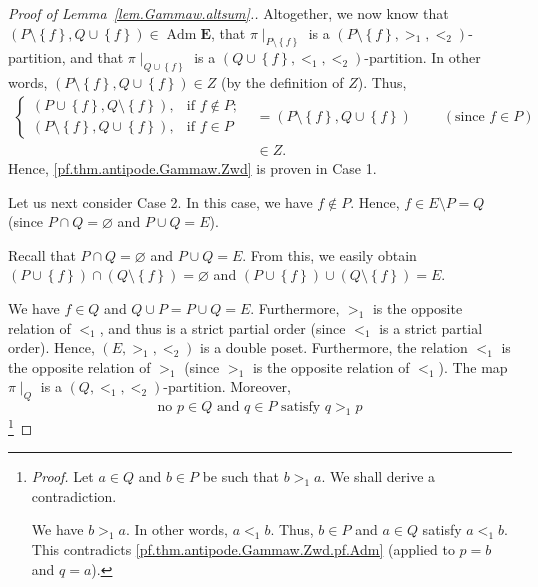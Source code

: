 \documentclass[12pt]{article}
\theoremstyle{plain}
\theoremstyle{definition}
\theoremstyle{remark}
\newcommand{\Adm}{\operatorname{Adm}}
\newcommand{\EE}{{\mathbf{E}}}
\begin{document}
\begin{proof}[Proof of Lemma~\ref{lem.Gammaw.altsum}.]
Altogether, we now know that $\left(  P\setminus\left\{  f\right\}
,Q\cup\left\{  f\right\}  \right)  \in \Adm \EE$, that
$\pi\mid_{P\setminus\left\{  f\right\}  }$ is a $\left(  P\setminus\left\{
f\right\}  ,>_{1},<_{2}\right)  $-partition, and that $\pi\mid_{Q\cup\left\{
f\right\}  }$ is a $\left(  Q\cup\left\{  f\right\}  ,<_{1},<_{2}\right)
$-partition. In other words, $\left(  P\setminus\left\{  f\right\}
,Q\cup\left\{  f\right\}  \right)  \in Z$ (by the definition of $Z$). Thus,
\begin{align*}
\begin{cases}
\left(  P\cup\left\{  f\right\}  ,Q\setminus\left\{  f\right\}  \right)  , &
\text{if }f\notin P;\\
\left(  P\setminus\left\{  f\right\}  ,Q\cup\left\{  f\right\}  \right)  , &
\text{if }f\in P
\end{cases}
& =\left(  P\setminus\left\{  f\right\}  ,Q\cup\left\{  f\right\}  \right)
\ \ \ \ \ \ \ \ \ \ \left(  \text{since }f\in P\right)  \\
& \in Z.
\end{align*}
Hence, \eqref{pf.thm.antipode.Gammaw.Zwd} is proven in Case 1.

Let us next consider Case 2. In this case, we have $f\notin P$. Hence,
$f \in E \setminus P = Q$ (since
$P \cap Q = \varnothing$ and $P \cup Q = E$).

Recall that $P\cap Q=\varnothing$ and $P\cup Q=E$. From this, we easily obtain
$\left(  P\cup\left\{  f\right\}  \right)  \cap\left(  Q\setminus\left\{
f\right\}  \right)  =\varnothing$ and $\left(  P\cup\left\{  f\right\}
\right)  \cup\left(  Q\setminus\left\{  f\right\}  \right)  =E$.

We have $f \in Q$ and
$Q \cup P = P \cup Q = E$. Furthermore, $>_1$ is the
opposite relation of $<_1$, and thus is a strict partial
order (since $<_1$ is a strict partial order). Hence,
$\left(E, >_1, <_2\right)$ is a double poset. Furthermore,
the relation $<_1$ is the opposite relation of $>_1$ (since $>_1$
is the opposite relation of $<_1$).
The map
$\pi\mid_Q$ is a $\left(Q, <_1, <_2\right)$-partition. Moreover,
\begin{equation}
\text{no } p \in Q \text{ and } q \in P \text{ satisfy }
q >_1 p
\label{pf.thm.antipode.Gammaw.Zwd.pf.AdmQP}
\end{equation}
\footnote{\textit{Proof.} Let $a \in Q$ and $b \in P$ be such that
$b >_1 a$. We shall derive a contradiction.

We have $b >_1 a$. In other words, $a <_1 b$. Thus, $b \in P$ and
$a \in Q$ satisfy $a <_1 b$. This contradicts
\eqref{pf.thm.antipode.Gammaw.Zwd.pf.Adm} (applied to $p = b$ and
$q = a$).

}
\end{proof}
\end{document}

